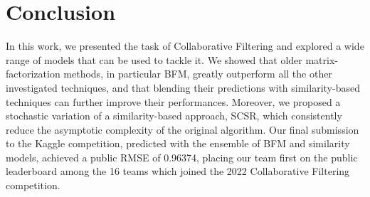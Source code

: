 \documentclass[sigconf]{acmart}
\begin{document}
\section{Conclusion}
\label{sect:conclusion}
In this work, we presented the task of Collaborative Filtering and explored a wide range of models that can be used to tackle it. 
We showed that older matrix-factorization methods, in particular BFM, greatly outperform all the other investigated techniques, and that blending their predictions with similarity-based techniques can further improve their performances. 
Moreover, we proposed a stochastic variation of a similarity-based approach, SCSR, which consistently reduce the asymptotic complexity of the original algorithm.
Our final submission to the Kaggle competition, predicted with the ensemble of BFM and similarity models, achieved a public RMSE of 0.96374, placing our team first on the public leaderboard among the 16 teams which joined the 2022 Collaborative Filtering competition.
\clearpage
\end{document}
